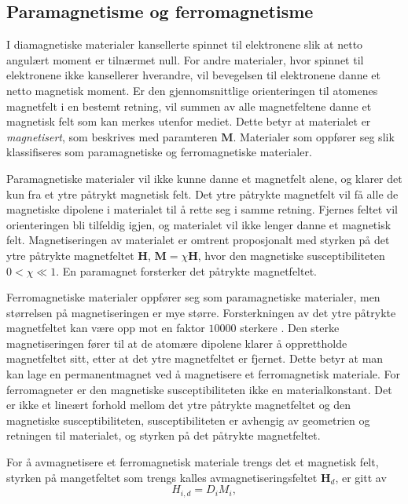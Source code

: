 \documentclass[%
 reprint,
 amsmath,amssymb,
 aps,
 norsk,
]{revtex4-1}
\begin{document}
\subsection{Paramagnetisme og ferromagnetisme}
I diamagnetiske materialer kansellerte spinnet til elektronene slik at netto angulært moment er tilnærmet null. For andre materialer, hvor spinnet til elektronene ikke kansellerer hverandre, vil bevegelsen til elektronene danne et netto magnetisk moment. Er den gjennomsnittlige orienteringen til atomenes magnetfelt i en bestemt retning, vil summen av alle magnetfeltene danne et magnetisk felt som kan merkes utenfor mediet. Dette betyr at materialet er \textit{magnetisert}, som beskrives med paramteren $\bm{M}$. Materialer som oppfører seg slik klassifiseres som paramagnetiske og ferromagnetiske materialer.\par
Paramagnetiske materialer vil ikke kunne danne et magnetfelt alene, og klarer det kun fra et ytre påtrykt magnetisk felt. Det ytre påtrykte magnetfelt vil få alle de magnetiske dipolene i materialet til å rette seg i samme retning. Fjernes feltet vil orienteringen bli tilfeldig igjen, og materialet vil ikke lenger danne et magnetisk felt. Magnetiseringen av materialet er omtrent proposjonalt med styrken på det ytre påtrykte magnetfeltet $\bm{H}$, $\bm{M} = \chi\bm{H}$, hvor den magnetiske susceptibiliteten $0<\chi\ll1$. En paramagnet forsterker det påtrykte magnetfeltet.
\par
Ferromagnetiske materialer oppfører seg som paramagnetiske materialer, men størrelsen på magnetiseringen er mye større. Forsterkningen av det ytre påtrykte magnetfeltet kan være opp mot en faktor $10 000$ sterkere \cite{oppgave}. Den sterke magnetiseringen fører til at de atomære dipolene klarer å opprettholde magnetfeltet sitt, etter at det ytre magnetfeltet er fjernet. Dette betyr at man kan lage en permanentmagnet ved å magnetisere et ferromagnetisk materiale. For ferromagneter er den magnetiske susceptibiliteten ikke en materialkonstant. Det er ikke et lineært forhold mellom det ytre påtrykte magnetfeltet og den magnetiske susceptibiliteten, susceptibiliteten er avhengig av geometrien og retningen til materialet, og styrken på det påtrykte magnetfeltet.
\par
For å avmagnetisere et ferromagnetisk materiale trengs det et magnetisk felt, styrken på mangetfeltet som trengs kalles avmagnetiseringsfeltet $\bm{H}_d$, er gitt av
\begin{equation}
  H_{i, d} = D_iM_i,
\end{equation}
\end{document}
